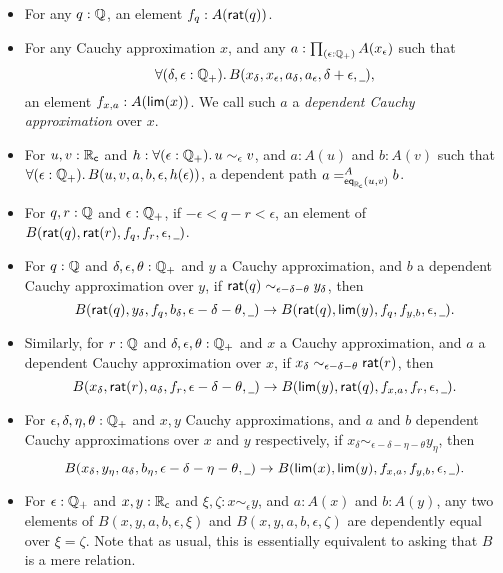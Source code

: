 \begin{itemize}
\item For any $q : \Q$, an element $f_q:A(\rcrat(q))$.
\item For any Cauchy approximation $x$, and any $a:\prd{\epsilon:\Qp} A(x_\epsilon)$ such that
  \begin{equation}
    \fall{\delta, \epsilon : \Qp} B(x_\delta,x_\epsilon,a_\delta,a_\epsilon,\delta+\epsilon,\blank),\label{eq:depCauchyappx}
  \end{equation}
  an element $f_{x,a}:A(\rclim(x))$.  We call such $a$ a \emph{dependent Cauchy approximation} over $x$.
\item For $u, v : \RC$ and $h:\fall{\epsilon : \Qp} u \sim_\epsilon v$, and $a:A(u)$ and $b:A(v)$ such that $\fall{\epsilon:\Qp} B(u,v,a,b,\epsilon,h(\epsilon))$, a dependent path $\dpath{A}{\rceq(u,v)}{a}{b}$.
\item For $q,r:\Q$ and $\epsilon:\Qp$, if $-\epsilon < q - r < \epsilon$, an element of $B(\rcrat(q),\rcrat(r),f_q,f_r,\epsilon,\blank)$.
\item For $q:\Q$ and $\delta,\epsilon,\theta:\Qp$ and $y$ a Cauchy approximation, and $b$ a dependent Cauchy approximation over $y$, if $\rcrat(q) \sim_{\epsilon - \delta - \theta} y_\delta$, then
  \[B(\rcrat(q),y_\delta,f_q,b_\delta,\epsilon-\delta-\theta,\blank)
  \to
  B(\rcrat(q),\rclim(y),f_q,f_{y,b},\epsilon,\blank).\]
\item Similarly, for $r:\Q$ and $\delta,\epsilon,\theta:\Qp$ and $x$ a Cauchy approximation, and $a$ a dependent Cauchy approximation over $x$, if $x_\delta \sim_{\epsilon - \delta - \theta} \rcrat(r)$, then
  \[B(x_\delta,\rcrat(r),a_\delta,f_r,\epsilon-\delta-\theta,\blank) \to
  B(\rclim(y),\rcrat(q),f_{x,a},f_r,\epsilon,\blank).
  \]
\item For $\epsilon,\delta,\eta,\theta:\Qp$ and $x,y$ Cauchy approximations, and $a$ and $b$ dependent Cauchy approximations over $x$ and $y$ respectively, if $x_\delta \sim_{\epsilon - \delta - \eta - \theta} y_\eta$, then
  \[ B(x_\delta,y_\eta,a_\delta,b_\eta,{\epsilon - \delta - \eta - \theta},\blank)\to
  B(\rclim(x),\rclim(y),f_{x,a},f_{y,b},\epsilon,\blank).\]
\item For $\epsilon:\Qp$ and $x,y:\RC$ and $\xi,\zeta:x\sim_{\epsilon} y$, and $a:A(x)$ and $b:A(y)$, any two elements of $B(x,y,a,b,\epsilon,\xi)$ and $B(x,y,a,b,\epsilon,\zeta)$ are dependently equal over $\xi=\zeta$.
  Note that as usual, this is essentially equivalent to asking that $B$ is a mere relation.
\end{itemize}
